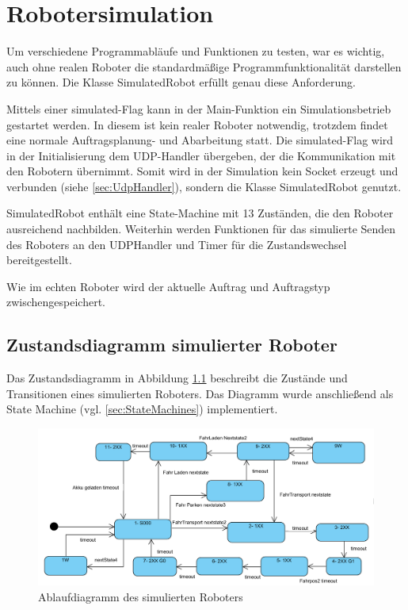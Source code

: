 
\chapter{Robotersimulation}
\label{sec:Simulation}

Um verschiedene Programmabläufe und Funktionen zu testen, war es wichtig, auch ohne realen Roboter die standardmäßige Programmfunktionalität darstellen zu können. Die Klasse SimulatedRobot erfüllt genau diese Anforderung. 

Mittels einer simulated-Flag kann in der Main-Funktion ein Simulationsbetrieb gestartet werden. In diesem ist kein realer Roboter notwendig, trotzdem findet eine normale Auftragsplanung- und Abarbeitung statt. Die simulated-Flag wird in der Initialisierung dem UDP-Handler übergeben, der die Kommunikation mit den Robotern übernimmt. Somit wird in der Simulation kein Socket erzeugt und verbunden (siehe \ref{sec:UdpHandler}), sondern die Klasse SimulatedRobot genutzt. 

SimulatedRobot enthält eine State-Machine mit 13 Zuständen, die den Roboter ausreichend nachbilden. Weiterhin werden Funktionen für das simulierte Senden des Roboters an den UDPHandler und Timer für die Zustandswechsel bereitgestellt. 

Wie im echten Roboter wird der aktuelle Auftrag und Auftragstyp zwischengespeichert. 

\section{Zustandsdiagramm simulierter Roboter}

Das Zustandsdiagramm in Abbildung \ref{fig:simRobot} beschreibt die Zustände und Transitionen eines simulierten Roboters. Das Diagramm wurde anschließend als State Machine (vgl. \ref{sec:StateMachines}) implementiert. 

\begin{figure}[htb]
    \centering
    \includegraphics[width=1\textwidth]{Abbildungen/SimulatedRobot.PNG}
    \caption{Ablaufdiagramm des simulierten Roboters}		
    \label{fig:simRobot}
\end{figure}


